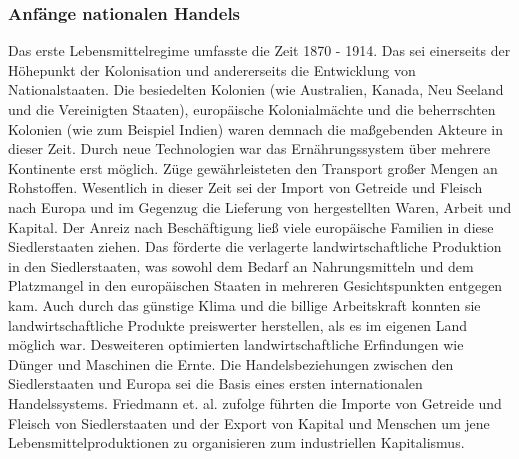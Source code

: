 \documentclass{scrartcl}
\begin{document}
\subsubsection*{Anfänge nationalen Handels}
Das erste Lebensmittelregime umfasste die Zeit 1870 - 1914. Das sei einerseits der Höhepunkt der Kolonisation und andererseits die Entwicklung von Nationalstaaten. Die besiedelten Kolonien (wie Australien, Kanada, Neu Seeland und die Vereinigten Staaten), europäische Kolonialmächte und die beherrschten Kolonien (wie zum Beispiel Indien) waren demnach die maßgebenden Akteure in dieser Zeit. Durch neue Technologien war das Ernährungssystem über mehrere Kontinente erst möglich. Züge gewährleisteten den Transport großer Mengen an Rohstoffen. Wesentlich in dieser Zeit sei der Import von Getreide und Fleisch nach Europa und im Gegenzug die Lieferung von hergestellten Waren, Arbeit und Kapital. Der Anreiz nach Beschäftigung ließ viele europäische Familien in diese Siedlerstaaten ziehen. Das förderte die verlagerte landwirtschaftliche Produktion in den Siedlerstaaten, was sowohl dem Bedarf an Nahrungsmitteln und dem Platzmangel in den europäischen Staaten in mehreren Gesichtspunkten entgegen kam. Auch durch das günstige Klima und die billige Arbeitskraft konnten sie landwirtschaftliche Produkte preiswerter herstellen, als es im eigenen Land möglich war. Desweiteren optimierten landwirtschaftliche Erfindungen wie Dünger und Maschinen die Ernte. Die Handelsbeziehungen zwischen den Siedlerstaaten und Europa sei die Basis eines ersten internationalen Handelssystems. Friedmann et. al. zufolge führten die Importe von Getreide und Fleisch von Siedlerstaaten und der Export von Kapital und Menschen um jene Lebensmittelproduktionen zu organisieren zum industriellen Kapitalismus. 
\end{document}
